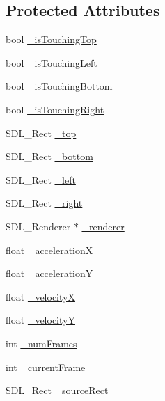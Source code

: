 \subsection*{Protected Attributes}
\begin{DoxyCompactItemize}
\item 
bool \hyperlink{class_x_d_l___sprite_ad7f8b1f515a3a42ad88ebe6aa29aeedd}{\-\_\-is\-Touching\-Top}
\item 
bool \hyperlink{class_x_d_l___sprite_a1cf89515bc7cfba9f65c1f650efaf464}{\-\_\-is\-Touching\-Left}
\item 
bool \hyperlink{class_x_d_l___sprite_ae1952187a8c7d3805f0823e898936872}{\-\_\-is\-Touching\-Bottom}
\item 
bool \hyperlink{class_x_d_l___sprite_a4f077e406b3a0d2ab2f2c12ee73d7be8}{\-\_\-is\-Touching\-Right}
\item 
S\-D\-L\-\_\-\-Rect \hyperlink{class_x_d_l___sprite_adbc4eb2f877c07dfd80701ee58575884}{\-\_\-top}
\item 
S\-D\-L\-\_\-\-Rect \hyperlink{class_x_d_l___sprite_a60f66817b4ac0d24e5623272216527c8}{\-\_\-bottom}
\item 
S\-D\-L\-\_\-\-Rect \hyperlink{class_x_d_l___sprite_ab8fda5bca5ea2e7245ee0f6ef6184f07}{\-\_\-left}
\item 
S\-D\-L\-\_\-\-Rect \hyperlink{class_x_d_l___sprite_a2d302603937aed34cb021183bfd1c375}{\-\_\-right}
\item 
S\-D\-L\-\_\-\-Renderer $\ast$ \hyperlink{class_x_d_l___sprite_aedcf07ef73df095eb6cd9843870cd002}{\-\_\-renderer}
\item 
float \hyperlink{class_x_d_l___sprite_a8b903a2d134b47d7afd8e6ec72ccff64}{\-\_\-acceleration\-X}
\item 
float \hyperlink{class_x_d_l___sprite_ada33278639ac05dbae0642f029163805}{\-\_\-acceleration\-Y}
\item 
float \hyperlink{class_x_d_l___sprite_a0a9c243d3f08c3ca76a9eee292e5b93d}{\-\_\-velocity\-X}
\item 
float \hyperlink{class_x_d_l___sprite_a44accc22025bb3fd43ec6db2513417f0}{\-\_\-velocity\-Y}
\item 
int \hyperlink{class_x_d_l___sprite_a64b44e17128d166f81a5ad0a3f1f0130}{\-\_\-num\-Frames}
\item 
int \hyperlink{class_x_d_l___sprite_a400af77ad887dec8bdb210e04299259a}{\-\_\-current\-Frame}
\item 
S\-D\-L\-\_\-\-Rect \hyperlink{class_x_d_l___sprite_a98c75cc4f4abc07331ad8de391a19675}{\-\_\-source\-Rect}
\item 

\end{DoxyCompactItemize}
